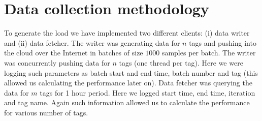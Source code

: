 \section{Data collection methodology}
\label{section:experiments}

To generate the load we have implemented two different clients:
(i) data writer and (ii) data fetcher. The writer was generating
data for $n$ tags and pushing into the cloud over the Internet 
in batches of size $1000$ samples per batch. The writer was 
concurrently pushing data for $n$ tags (one thread per tag).
Here we were logging such parameters as batch start and end 
time, batch number and tag (this allowed us calculating the 
performance later on). Data fetcher was querying the data 
for $m$ tags for 1 hour period. Here we logged start time,
end time, iteration and tag name. Again such information 
allowed us to calculate the performance for various number 
of tags.

